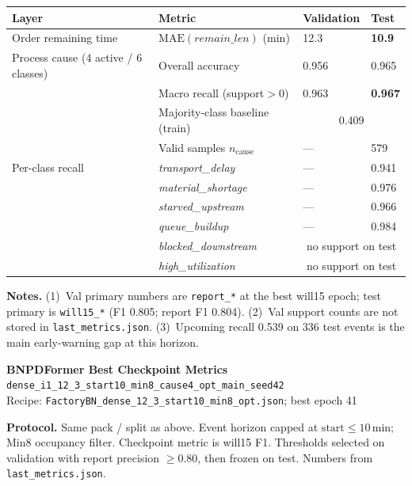\documentclass[10pt,a4paper]{article}
\begin{document}
\begin{center}
\begin{tabular}{l l l l}
\toprule
Layer & Metric & Validation & Test \\
\midrule
Order remaining time
  & $\mathrm{MAE}(\textit{remain\_len})$ (min)
  & 12.3
  & \textbf{10.9} \\
\midrule
Process cause (4 active / 6 classes)
  & Overall accuracy
  & 0.956
  & 0.965 \\
  & Macro recall (support${>}0$)
  & 0.963
  & \textbf{0.967} \\
  & Majority-class baseline (train)
  & \multicolumn{2}{c}{0.409} \\
  & Valid samples $n_{\mathrm{cause}}$
  & ---
  & 579 \\
\midrule
Per-class recall
  & \textit{transport\_delay}
  & --- & 0.941 \\
  & \textit{material\_shortage}
  & --- & 0.976 \\
  & \textit{starved\_upstream}
  & --- & 0.966 \\
  & \textit{queue\_buildup}
  & --- & 0.984 \\
  & \textit{blocked\_downstream}
  & \multicolumn{2}{c}{no support on test} \\
  & \textit{high\_utilization}
  & \multicolumn{2}{c}{no support on test} \\
\bottomrule
\end{tabular}
\end{center}

\small
\textbf{Notes.}
(1)~Val primary numbers are \texttt{report\_*} at the best will15 epoch; test primary is \texttt{will15\_*} (F1 0.805; report F1 0.804).
(2)~Val support counts are not stored in \texttt{last\_metrics.json}.
(3)~Upcoming recall 0.539 on 336 test events is the main early-warning gap at this horizon.

\clearpage
\begin{center}
{\LARGE\bfseries BNPDFormer Best Checkpoint Metrics}\\[3pt]
{\large\texttt{dense\_i1\_12\_3\_start10\_min8\_cause4\_opt\_main\_seed42}}\\[2pt]
{\normalsize Recipe: \texttt{FactoryBN\_dense\_12\_3\_start10\_min8\_opt.json}; best epoch 41}
\end{center}

\textbf{Protocol.}
Same pack / split as above.
Event horizon capped at $\mathrm{start}\le 10$\,min; Min8 occupancy filter.
Checkpoint metric is will15 F1.
Thresholds selected on validation with report precision $\ge 0.80$, then frozen on test.
Numbers from \texttt{last\_metrics.json}.
\end{document}
